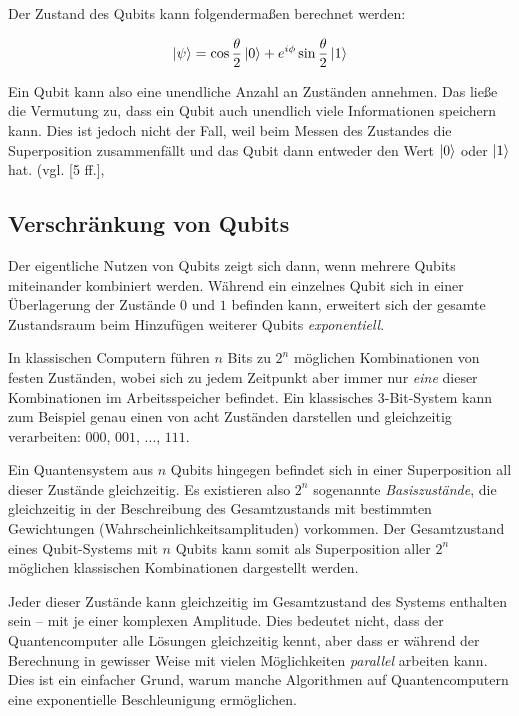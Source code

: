 Der Zustand des Qubits kann folgendermaßen berechnet werden:

\begin{equation}
  \ket{\psi} = \cos\frac{\theta}{2} \ket{0} + e^{i\phi} \sin\frac{\theta}{2} \ket{1}
\end{equation}

Ein Qubit kann also eine unendliche Anzahl an Zuständen annehmen. Das ließe die Vermutung zu, dass ein Qubit auch unendlich viele Informationen speichern kann. Dies ist jedoch nicht der Fall, weil beim Messen des Zustandes die Superposition zusammenfällt und das Qubit dann entweder den Wert $\ket{0}$ oder $\ket{1}$ hat. (vgl. [5 ff.]\cite{pattanayak_quantum_2017}, \cite[15 f.]{nielsen_quantum_2010}

\subsection{Verschränkung von Qubits}
\label{subsec:verschraenkungQubits}

Der eigentliche Nutzen von Qubits zeigt sich dann, wenn mehrere Qubits miteinander kombiniert werden. Während ein einzelnes Qubit sich in einer Überlagerung der Zustände \(0\) und \(1\) befinden kann, erweitert sich der gesamte Zustandsraum beim Hinzufügen weiterer Qubits \emph{exponentiell}.

In klassischen Computern führen \(n\) Bits zu \(2^n\) möglichen Kombinationen von festen Zuständen, wobei sich zu jedem Zeitpunkt aber immer nur \emph{eine} dieser Kombinationen im Arbeitsspeicher befindet. Ein klassisches 3-Bit-System kann zum Beispiel genau einen von acht Zuständen darstellen und gleichzeitig verarbeiten: \(000\), \(001\), ..., \(111\).

Ein Quantensystem aus \(n\) Qubits hingegen befindet sich in einer Superposition all dieser Zustände gleichzeitig. Es existieren also \(2^n\) sogenannte \emph{Basiszustände}, die gleichzeitig in der Beschreibung des Gesamtzustands mit bestimmten Gewichtungen (Wahrscheinlichkeitsamplituden) vorkommen. Der Gesamtzustand eines Qubit-Systems mit \(n\) Qubits kann somit als Superposition aller \(2^n\) möglichen klassischen Kombinationen dargestellt werden.

Jeder dieser Zustände kann gleichzeitig im Gesamtzustand des Systems enthalten sein – mit je einer komplexen Amplitude. Dies bedeutet nicht, dass der Quantencomputer alle Lösungen gleichzeitig kennt, aber dass er während der Berechnung in gewisser Weise mit vielen Möglichkeiten \emph{parallel} arbeiten kann. Dies ist ein einfacher Grund, warum manche Algorithmen auf Quantencomputern eine exponentielle Beschleunigung ermöglichen.

